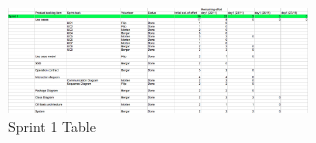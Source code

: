 \documentclass[11pt,a4paper]{article}
\begin{document}
\begin{figure}[H]
  		\centering
    	\includegraphics[width=300px]{images/Sprint1_Table.png}
    	\caption{Sprint 1 Table}
\end{figure}
\end{document}
